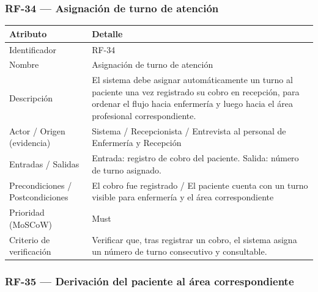 \documentclass[11pt,a4paper]{article}
\begin{document}
	\subsubsection{RF-34 --- Asignación de turno de atención}
	
	\begin{longtable}{p{} p{}}
		
		\toprule
		\textbf{Atributo} & \textbf{Detalle} \\
		\midrule
		\endhead
		
		Identificador & RF-34  \\
		Nombre & Asignación de turno de atención \\
		Descripción & El sistema debe asignar automáticamente un turno al paciente una vez registrado su cobro en recepción, para ordenar el flujo hacia enfermería y luego hacia el área profesional correspondiente. \\
		Actor / Origen (evidencia) & Sistema / Recepcionista / Entrevista al personal de Enfermería y Recepción \\
		Entradas / Salidas & Entrada: registro de cobro del paciente. Salida: número de turno asignado. \\
		Precondiciones / Postcondiciones & El cobro fue registrado / El paciente cuenta con un turno visible para enfermería y el área correspondiente \\
		Prioridad (MoSCoW) & Must \\
		Criterio de verificación & Verificar que, tras registrar un cobro, el sistema asigna un número de turno consecutivo y consultable. \\
		\bottomrule
	\end{longtable}
	
	\subsubsection{RF-35 --- Derivación del paciente al área correspondiente}
	
\end{document}
